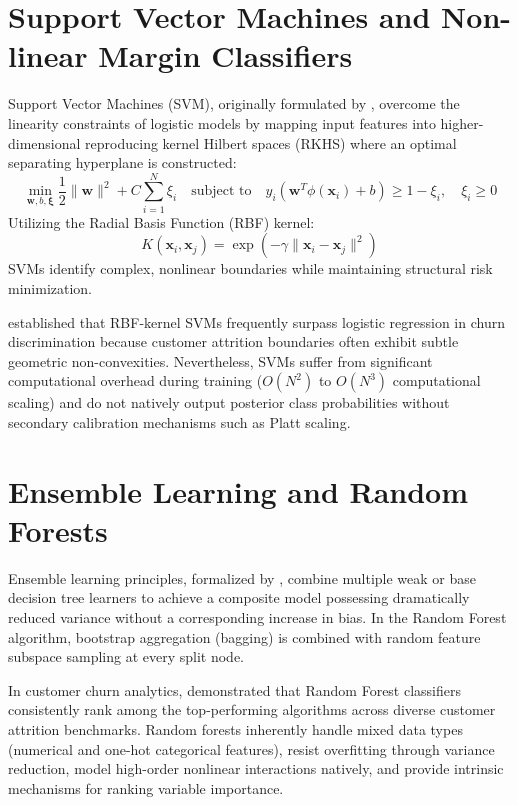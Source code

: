 \documentclass[12pt,a4paper]{report}
\begin{document}
\section{Support Vector Machines and Non-linear Margin Classifiers}
Support Vector Machines (SVM), originally formulated by \citet{cortes1995support}, overcome the linearity constraints of logistic models by mapping input features into higher-dimensional reproducing kernel Hilbert spaces (RKHS) where an optimal separating hyperplane is constructed:
\begin{equation}
    \min_{\mathbf{w}, b, \boldsymbol{\xi}} \frac{1}{2} \|\mathbf{w}\|^2 + C \sum_{i=1}^N \xi_i \quad \text{subject to} \quad y_i (\mathbf{w}^T \phi(\mathbf{x}_i) + b) \ge 1 - \xi_i, \quad \xi_i \ge 0
\end{equation}
Utilizing the Radial Basis Function (RBF) kernel:
\begin{equation}
    K(\mathbf{x}_i, \mathbf{x}_j) = \exp\left(-\gamma \|\mathbf{x}_i - \mathbf{x}_j\|^2\right)
\end{equation}
SVMs identify complex, nonlinear boundaries while maintaining structural risk minimization. 

\citet{coussement2008churn} established that RBF-kernel SVMs frequently surpass logistic regression in churn discrimination because customer attrition boundaries often exhibit subtle geometric non-convexities. Nevertheless, SVMs suffer from significant computational overhead during training ($O(N^2)$ to $O(N^3)$ computational scaling) and do not natively output posterior class probabilities without secondary calibration mechanisms such as Platt scaling.

\section{Ensemble Learning and Random Forests}
Ensemble learning principles, formalized by \citet{breiman2001random}, combine multiple weak or base decision tree learners to achieve a composite model possessing dramatically reduced variance without a corresponding increase in bias. In the Random Forest algorithm, bootstrap aggregation (bagging) is combined with random feature subspace sampling at every split node. 

In customer churn analytics, \citet{verbeke2012building} demonstrated that Random Forest classifiers consistently rank among the top-performing algorithms across diverse customer attrition benchmarks. Random forests inherently handle mixed data types (numerical and one-hot categorical features), resist overfitting through variance reduction, model high-order nonlinear interactions natively, and provide intrinsic mechanisms for ranking variable importance.
\end{document}
